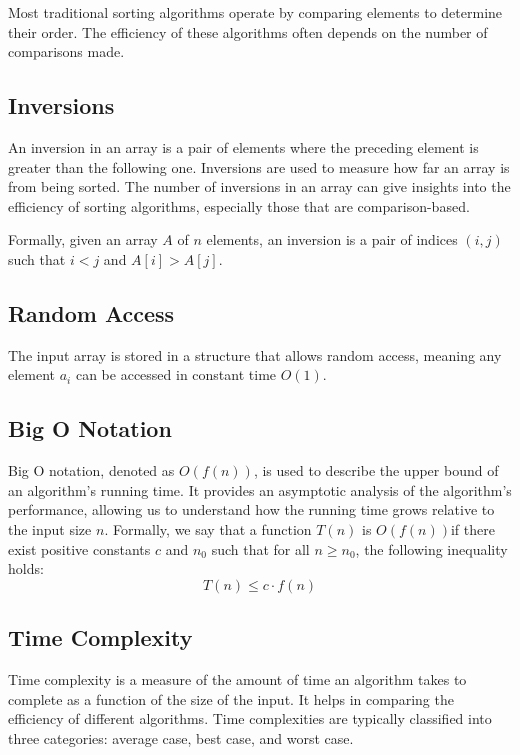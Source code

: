 \documentclass[sigplan,screen]{acmart}
\begin{document}
  Most traditional sorting algorithms operate by comparing elements to 
  determine their order. The efficiency of these algorithms often depends 
  on the number of comparisons made.


  \subsection{Inversions}
  An inversion in an array is a pair of elements where the preceding element
  is greater than the following one. Inversions are used to measure how far
  an array is from being sorted. The number of inversions in an array can 
  give insights into the efficiency of sorting algorithms, especially those 
  that are comparison-based.

  Formally, given an array \( A \) of \( n \) elements, an inversion is a 
  pair of indices \( (i, j) \) such that \( i < j \) and \( A[i] > A[j] \).



  \subsection{Random Access}
  
  The input array is stored in a structure that allows random access, meaning 
  any element $a_i$ can be accessed in constant time $O(1)$.

  \subsection{Big O Notation}
  
  Big O notation, denoted as $O(f(n))$, is used to describe the upper bound 
  of an algorithm's running time. It provides an asymptotic analysis of the
  algorithm's performance, allowing us to understand how the running time 
  grows relative to the input size $n$. Formally, we say that a function 
  $T(n)$ is $O(f(n))$if there exist positive constants $c$ and $n_0$ 
  such that for all $n \geq n_0$, the following inequality holds:
  \[
  T(n) \leq c \cdot f(n)
  \]
  
  \subsection{Time Complexity}
  
  Time complexity is a measure of the amount of time an algorithm takes 
  to complete as a function of the size of the input. It helps in comparing
  the efficiency of different algorithms. Time complexities are typically 
  classified into three categories: average case, best case, and worst 
  case.
  
\end{document}
